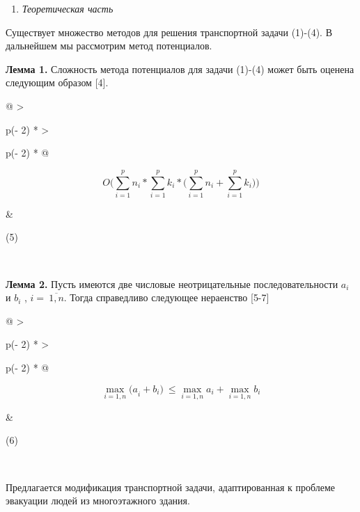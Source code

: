 \documentclass[
]{article}
\begin{document}
\begin{enumerate}
\def\labelenumi{\arabic{enumi}.}
\setcounter{enumi}{1}
\item
  \emph{Теоретическая часть}
\end{enumerate}

Существует множество методов для решения транспортной задачи (1)-(4). В
дальнейшем мы рассмотрим метод потенциалов.

\textbf{Лемма 1.} Сложность метода потенциалов для задачи (1)-(4) может
быть оценена следующим образом {[}4{]}.

\begin{longtable}[]{@{}
  >{\raggedright\arraybackslash}p{(\columnwidth - 2\tabcolsep) * }
  >{\raggedright\arraybackslash}p{(\columnwidth - 2\tabcolsep) * }@{}}
\toprule\noalign{}
\begin{minipage}[b]{\linewidth}\raggedright
\[O(\sum_{i = 1}^{p}n_{i}*\sum_{i = 1}^{p}k_{i}*(\sum_{i = 1}^{p}n_{i} + \sum_{i = 1}^{p}{k_{i}))}\]
\end{minipage} & \begin{minipage}[b]{\linewidth}\raggedright
(5)
\end{minipage} \\
\midrule\noalign{}
\endhead
\bottomrule\noalign{}
\endlastfoot
\end{longtable}

\textbf{Лемма 2.} Пусть имеются две числовые неотрицательные
последовательности \(a_{i}\) и \(b_{i}\) , \(i = \ \overline{1,n}\).
Тогда справедливо следующее нераенство {[}5-7{]}

\begin{longtable}[]{@{}
  >{\raggedright\arraybackslash}p{(\columnwidth - 2\tabcolsep) * }
  >{\raggedright\arraybackslash}p{(\columnwidth - 2\tabcolsep) * }@{}}
\toprule\noalign{}
\begin{minipage}[b]{\linewidth}\raggedright
\[\max_{i = 1,n}{{(a}_{i} + b_{i})\  \leq}\max_{i = 1,n}a_{i} + \max_{i = 1,n}b_{i}\]
\end{minipage} & \begin{minipage}[b]{\linewidth}\raggedright
(6)
\end{minipage} \\
\midrule\noalign{}
\endhead
\bottomrule\noalign{}
\endlastfoot
\end{longtable}

Предлагается модификация транспортной задачи, адаптированная к проблеме
эвакуации людей из многоэтажного здания.
\end{document}
